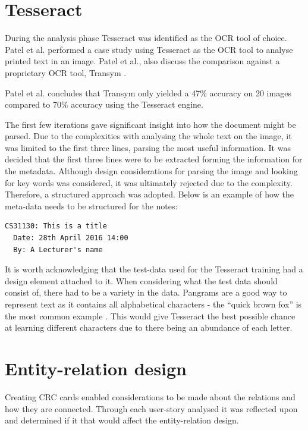 \section{Tesseract} \label{design:tesseract}
During the analysis phase Tesseract was identified as the OCR tool of choice. Patel et al. \cite{citeulike:13920892} performed a case study using Tesseract as the OCR tool to analyse printed text in an image. Patel et al., also discuss the comparison against a proprietary OCR tool, Transym \cite{citeulike:14023819}.

Patel et al. concludes that Transym only yielded a 47\% accuracy on 20 images compared to 70\% accuracy using the Tesseract engine.

The first few iterations gave significant insight into how the document might be parsed. Due to the complexities with analysing the whole text on the image, it was limited to the first three lines, parsing the most useful information. It was decided that the first three lines were to be extracted forming the information for the metadata. Although design considerations for parsing the image and looking for key words was considered, it was ultimately rejected due to the complexity. Therefore, a structured approach was adopted. Below is an example of how the meta-data needs to be structured for the notes:

\begin{lstlisting}[caption={An example exert from a valid structured note}, label={lst:mock1}, breaklines, columns=fullflexible, basicstyle=\normalsize\ttfamily]
  CS31130: This is a title
  Date: 28th April 2016 14:00
  By: A Lecturer's name
\end{lstlisting}



It is worth acknowledging that the test-data used for the Tesseract training had a design element attached to it. When considering what the test data should consist of, there had to be a variety in the data. Pangrams are a good way to represent text as it contains all alphabetical characters -  the ``quick brown fox'' is the most common example \cite{citeulike:14023830}. This would give Tesseract the best possible chance at learning different characters due to there being an abundance of each letter.

\section{Entity-relation design}\label{section:er_diagram}
Creating CRC cards enabled considerations to be made about the relations and how they are connected. Through each user-story analysed it was reflected upon and determined if it that would affect the entity-relation design.

